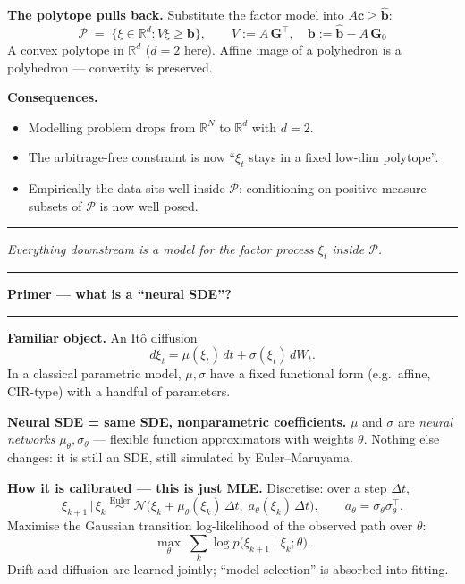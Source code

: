 \documentclass[12pt]{article}
\newcommand{\slide}[1]{%
  \par\noindent\rule{\linewidth}{1.2pt}\par\vspace{2pt}%
  {\LARGE\bfseries #1}\par\vspace{2pt}%
  \noindent\rule{\linewidth}{0.5pt}\par\vspace{8pt}}
\newcommand{\footer}[1]{\vfill\noindent\rule{\linewidth}{0.3pt}\par
  {\small\itshape #1}}
\newcommand{\R}{\mathbb{R}}
\newcommand{\cP}{\mathcal{P}}
\begin{document}
\vspace{8pt}
\textbf{The polytope pulls back.} Substitute the factor model into
$A\mathbf c \ge \mathbf{\hat b}$:
\[
\boxed{\;\cP \;=\; \{\xi \in \R^d : V\xi \ge \mathbf b\}, \qquad
V := A\,\mathbf G^\top, \quad \mathbf b := \mathbf{\hat b} - A\,\mathbf G_0\;}
\]
A convex polytope in $\R^d$ ($d=2$ here). Affine image of a polyhedron is a
polyhedron --- convexity is preserved.

\vspace{8pt}
\textbf{Consequences.}
\begin{itemize}
\item Modelling problem drops from $\R^N$ to $\R^d$ with $d=2$.
\item The arbitrage-free constraint is now ``$\xi_t$ stays in a fixed
  low-dim polytope''.
\item Empirically the data sits well inside $\cP$: conditioning on
  positive-measure subsets of $\cP$ is now well posed.
\end{itemize}

\footer{Everything downstream is a model for the factor process $\xi_t$ inside $\cP$.}
\clearpage

\slide{Primer --- what is a ``neural SDE''?}

\textbf{Familiar object.} An It\^o diffusion
\[
d\xi_t = \mu(\xi_t)\,dt + \sigma(\xi_t)\,dW_t .
\]
In a classical parametric model, $\mu,\sigma$ have a fixed functional form
(e.g.\ affine, CIR-type) with a handful of parameters.

\vspace{8pt}
\textbf{Neural SDE = same SDE, nonparametric coefficients.}
$\mu$ and $\sigma$ are \emph{neural networks} $\mu_\theta,\sigma_\theta$ ---
flexible function approximators with weights $\theta$. Nothing else changes:
it is still an SDE, still simulated by Euler--Maruyama.

\vspace{8pt}
\textbf{How it is calibrated --- this is just MLE.}
Discretise: over a step $\Delta t$,
\[
\xi_{k+1} \,\big|\, \xi_k \;\overset{\text{Euler}}{\sim}\;
\mathcal N\!\bigl(\xi_k + \mu_\theta(\xi_k)\,\Delta t,\;
a_\theta(\xi_k)\,\Delta t\bigr),
\qquad a_\theta = \sigma_\theta\sigma_\theta^\top .
\]
Maximise the Gaussian transition log-likelihood of the observed path over
$\theta$:
\[
\max_\theta \;\sum_k \log p\bigl(\xi_{k+1}\mid\xi_k;\theta\bigr).
\]
Drift and diffusion are learned jointly; ``model selection'' is absorbed
into fitting.
\end{document}
